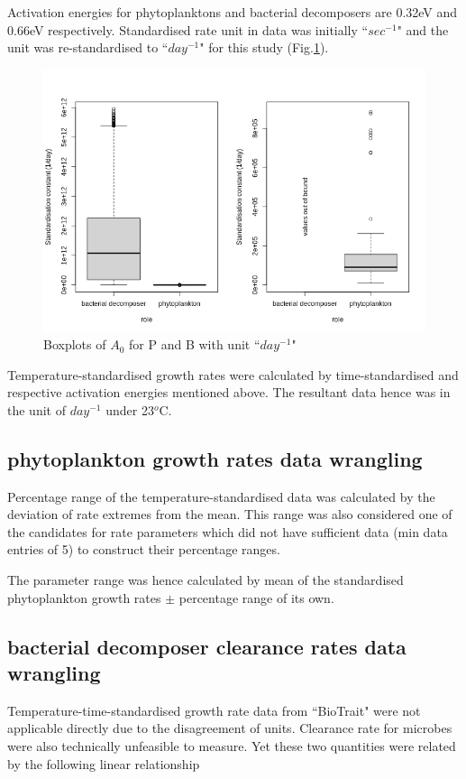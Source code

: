 \documentclass[../thesis.tex]{subfiles} %
\begin{document}
Activation energies for phytoplanktons and bacterial decomposers are 0.32eV and 0.66eV respectively.\autocite{regaudie2012temperature}  Standardised rate unit in data was initially ``$sec^{-1}$" and the unit was re-standardised to ``$day^{-1}$" for this study (Fig.\ref{growStdVal}).

\begin{figure}[H]
    \centering
    \includegraphics[width=\linewidth]{../result/stdCst.png}
    \caption[Boxplot of standardised $A_0$]{Boxplots of $A_0$ for P and B with unit ``$day^{-1}$"}
    \label{growStdVal}
\end{figure}

Temperature-standardised growth rates were calculated by time-standardised and respective activation energies mentioned above.  The resultant data hence was in the unit of $day^{-1}$ under 23$^o$C.

\subsection{phytoplankton growth rates data wrangling}
Percentage range of the temperature-standardised data was calculated by the deviation of rate extremes from the mean.  This range was also considered one of the candidates for rate parameters which did not have sufficient data (min data entries of 5) to construct their percentage ranges.

The parameter range was hence calculated by mean of the standardised phytoplankton growth rates $\pm$ percentage range of its own.

\subsection{bacterial decomposer clearance rates data wrangling}
Temperature-time-standardised growth rate data from ``BioTrait" were not applicable directly due to the disagreement of units.  Clearance rate for microbes were also technically unfeasible to measure.  Yet these two quantities were related by the following linear relationship
\end{document}
